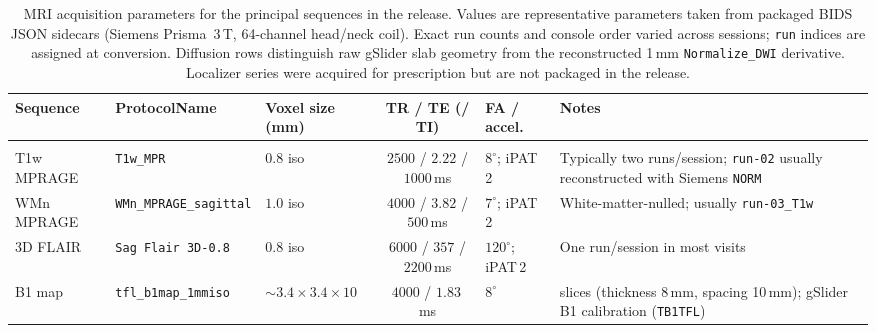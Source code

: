\begin{table}[htbp]
\centering
\caption{MRI acquisition parameters for the principal sequences in the release.
Values are representative parameters taken from packaged BIDS JSON sidecars
(Siemens Prisma~3\,T, 64-channel head/neck coil). Exact run counts and console
order varied across sessions; \texttt{run} indices are assigned at conversion.
Diffusion rows distinguish raw gSlider slab geometry from the reconstructed
1\,mm \texttt{Normalize\_DWI} derivative. Localizer series were acquired for
prescription but are not packaged in the release.}
\label{tab:mri_acq_parameters}
\footnotesize
\setlength{\tabcolsep}{3.5pt}
\renewcommand{\arraystretch}{1.15}
\begin{adjustbox}{max width=\textwidth,center}
\begin{tabular}{@{}>{\raggedright\arraybackslash}p{2.6cm}
                >{\raggedright\arraybackslash}p{2.4cm}
                >{\raggedright\arraybackslash}p{2.1cm}
                c
                >{\raggedright\arraybackslash}p{2.0cm}
                >{\raggedright\arraybackslash}p{3.6cm}@{}}
\toprule
\textcolor{headergray}{\textbf{Sequence}} &
\textcolor{headergray}{\textbf{ProtocolName}} &
\textcolor{headergray}{\textbf{Voxel size (mm)}} &
\textcolor{headergray}{\textbf{TR / TE (/ TI)}} &
\textcolor{headergray}{\textbf{FA / accel.}} &
\textcolor{headergray}{\textbf{Notes}} \\
\midrule
\multicolumn{6}{@{}l}{\textit{Anatomical}} \\
\midrule
T1w MPRAGE & \texttt{T1w\_MPR} & $0.8$ iso & $2500$ / $2.22$ / $1000$\,ms & $8^\circ$; iPAT\,2 & Typically two runs/session; \texttt{run-02} usually reconstructed with Siemens \texttt{NORM} \\
\rowcolor{tablealt}
WMn MPRAGE & \texttt{WMn\_MPRAGE\_sagittal} & $1.0$ iso & $4000$ / $3.82$ / $500$\,ms & $7^\circ$; iPAT\,2 & White-matter-nulled; usually \texttt{run-03\_T1w} \\
3D FLAIR & \texttt{Sag Flair 3D-0.8} & $0.8$ iso & $6000$ / $357$ / $2200$\,ms & $120^\circ$; iPAT\,2 & One run/session in most visits \\
\rowcolor{tablealt}
B1 map & \texttt{tfl\_b1map\_1mmiso} & $\sim 3.4\times3.4\times10$ & $4000$ / $1.83$\,ms & $8^\circ$ & 15 slices (thickness 8\,mm, spacing 10\,mm); gSlider B1 calibration (\texttt{TB1TFL}) \\

\end{tabular}
\end{adjustbox}
\end{table}
